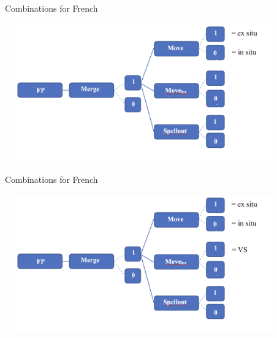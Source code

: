 \documentclass[lesson_slides]{subfiles}
\begin{document}
\begin{frame}[c]{Combinations for French}

    \begin{center}
        \includegraphics[width=12cm, height=6cm]{images/combinationsfrench2.png}
    \end{center}

\end{frame}
\begin{frame}[c]{Combinations for French}

    \begin{center}
        \includegraphics[width=12cm, height=6cm]{images/combinationsfrench3.png}
    \end{center}

\end{frame}
\end{document}
